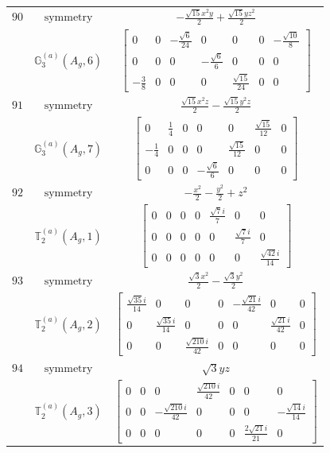 \documentclass[fleqn,8pt,landscape]{jsarticle}
\begin{document}
\begin{longtable}{ccc}
$ 90 $ & $ \text{symmetry} $ & $ - \frac{\sqrt{15} x^{2} y}{2} + \frac{\sqrt{15} y z^{2}}{2} $ \\
$  $ & $ \mathbb{G}_{3}^{(a)}(A_{g},6) $ & $ \begin{bmatrix} 0 & 0 & - \frac{\sqrt{6}}{24} & 0 & 0 & 0 & - \frac{\sqrt{10}}{8} \\ 0 & 0 & 0 & - \frac{\sqrt{6}}{6} & 0 & 0 & 0 \\ - \frac{3}{8} & 0 & 0 & 0 & \frac{\sqrt{15}}{24} & 0 & 0 \end{bmatrix} $ \\ \hline
$ 91 $ & $ \text{symmetry} $ & $ \frac{\sqrt{15} x^{2} z}{2} - \frac{\sqrt{15} y^{2} z}{2} $ \\
$  $ & $ \mathbb{G}_{3}^{(a)}(A_{g},7) $ & $ \begin{bmatrix} 0 & \frac{1}{4} & 0 & 0 & 0 & \frac{\sqrt{15}}{12} & 0 \\ - \frac{1}{4} & 0 & 0 & 0 & \frac{\sqrt{15}}{12} & 0 & 0 \\ 0 & 0 & 0 & - \frac{\sqrt{6}}{6} & 0 & 0 & 0 \end{bmatrix} $ \\ \hline
$ 92 $ & $ \text{symmetry} $ & $ - \frac{x^{2}}{2} - \frac{y^{2}}{2} + z^{2} $ \\
$  $ & $ \mathbb{T}_{2}^{(a)}(A_{g},1) $ & $ \begin{bmatrix} 0 & 0 & 0 & 0 & \frac{\sqrt{7} i}{7} & 0 & 0 \\ 0 & 0 & 0 & 0 & 0 & \frac{\sqrt{7} i}{7} & 0 \\ 0 & 0 & 0 & 0 & 0 & 0 & \frac{\sqrt{42} i}{14} \end{bmatrix} $ \\ \hline
$ 93 $ & $ \text{symmetry} $ & $ \frac{\sqrt{3} x^{2}}{2} - \frac{\sqrt{3} y^{2}}{2} $ \\
$  $ & $ \mathbb{T}_{2}^{(a)}(A_{g},2) $ & $ \begin{bmatrix} \frac{\sqrt{35} i}{14} & 0 & 0 & 0 & - \frac{\sqrt{21} i}{42} & 0 & 0 \\ 0 & \frac{\sqrt{35} i}{14} & 0 & 0 & 0 & \frac{\sqrt{21} i}{42} & 0 \\ 0 & 0 & \frac{\sqrt{210} i}{42} & 0 & 0 & 0 & 0 \end{bmatrix} $ \\ \hline
$ 94 $ & $ \text{symmetry} $ & $ \sqrt{3} y z $ \\
$  $ & $ \mathbb{T}_{2}^{(a)}(A_{g},3) $ & $ \begin{bmatrix} 0 & 0 & 0 & \frac{\sqrt{210} i}{42} & 0 & 0 & 0 \\ 0 & 0 & - \frac{\sqrt{210} i}{42} & 0 & 0 & 0 & - \frac{\sqrt{14} i}{14} \\ 0 & 0 & 0 & 0 & 0 & \frac{2 \sqrt{21} i}{21} & 0 \end{bmatrix} $ \\ \hline

\end{longtable}
\end{document}
